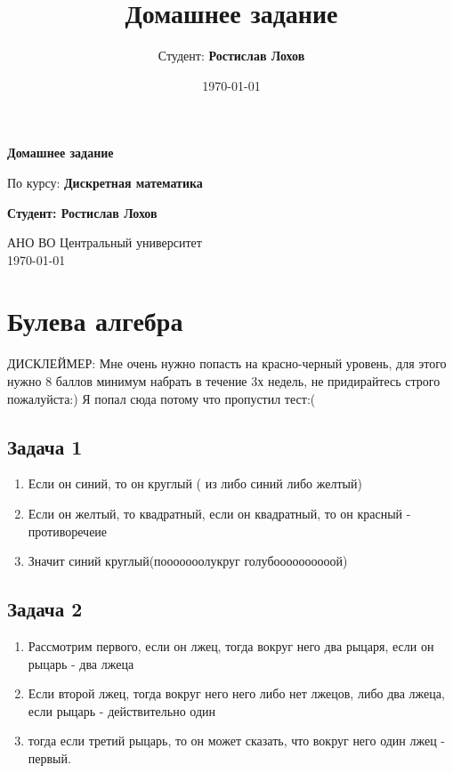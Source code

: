 \documentclass[a4paper,12pt]{article}
\title{Домашнее задание}
\author{Студент: \textbf{Ростислав Лохов}}
\date{\today}
\begin{document}
\begin{titlepage}
    \centering
    \vspace*{1cm}

    \Huge
    \textbf{Домашнее задание}

    \vspace{0.5cm}
    \LARGE
    По курсу: \textbf{Дискретная математика}

    \vspace{1.5cm}

    \textbf{Студент: Ростислав Лохов}

    \vfill

    \Large
    АНО ВО Центральный университет\\
    \vspace{0.3cm}
    \today

\end{titlepage}

\tableofcontents
\newpage

\section{Булева алгебра}

ДИСКЛЕЙМЕР: Мне очень нужно попасть на красно-черный уровень, для этого нужно 8  баллов минимум набрать в течение 3х недель, не придирайтесь строго пожалуйста:) Я попал сюда потому что пропустил тест:(

\subsection{Задача 1}
\begin{enumerate}
    \item Если он синий, то он круглый ( из либо синий либо желтый)
    \item Если он желтый, то квадратный, если он квадратный, то он красный - противоречеие
    \item Значит синий круглый(пооооооолукруг голубоооооооооой)
\end{enumerate}

\subsection{Задача 2}
\begin{enumerate}
    \item Рассмотрим первого, если он лжец, тогда вокруг него два рыцаря, если он рыцарь - два лжеца
    \item Если второй лжец, тогда вокруг него него либо нет лжецов, либо два лжеца, если рыцарь - действительно один 
    \item тогда если третий рыцарь, то он может сказать, что вокруг него один лжец - первый.
\end{enumerate}
\end{document}

